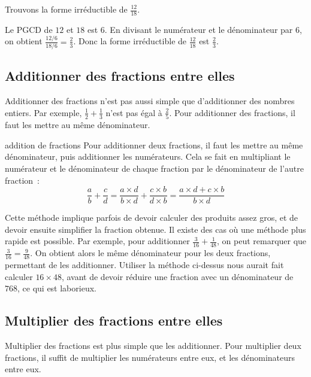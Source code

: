 \documentclass[12pt]{article}
\begin{document}
\begin{exemple}{}{}
    Trouvons la forme irréductible de $\frac{12}{18}$.

    Le PGCD de $12$ et $18$ est $6$. En divisant le numérateur et le dénominateur par $6$, on obtient $\frac{12 / 6}{18 / 6} = \frac{2}{3}$. Donc la forme irréductible de $\frac{12}{18}$ est $\frac{2}{3}$.
\end{exemple}

\subsection{Additionner des fractions entre elles}

Additionner des fractions n'est pas aussi simple que d'additionner des nombres entiers. Par exemple, $\frac{1}{2} + \frac{1}{3}$ n'est pas égal à $\frac{2}{5}$. Pour additionner des fractions, il faut les mettre au même dénominateur.

\begin{proposition}{}{addition de fractions}
    Pour additionner deux fractions, il faut les mettre au même dénominateur, puis additionner les numérateurs. Cela se fait en multipliant le numérateur et le dénominateur de chaque fraction par le dénominateur de l'autre fraction~:
    $$\frac{a}{b} + \frac{c}{d} = \frac{a \times d}{b \times d} + \frac{c \times b}{d \times b} = \frac{a \times d + c \times b}{b \times d}$$
\end{proposition}

\begin{remarque}{}{}
    Cette méthode implique parfois de devoir calculer des produits assez gros, et de devoir ensuite simplifier la fraction obtenue. Il existe des cas où une méthode plus rapide est possible. Par exemple, pour additionner $\frac{3}{16} + \frac{1}{48}$, on peut remarquer que $\frac{3}{16} = \frac{9}{48}$. On obtient alors le même dénominateur pour les deux fractions, permettant de les additionner. Utiliser la méthode ci-dessus nous aurait fait calculer $16 \times 48$, avant de devoir réduire une fraction avec un dénominateur de $768$, ce qui est laborieux.
\end{remarque}

\subsection{Multiplier des fractions entre elles}

Multiplier des fractions est plus simple que les additionner. Pour multiplier deux fractions, il suffit de multiplier les numérateurs entre eux, et les dénominateurs entre eux.
\end{document}
